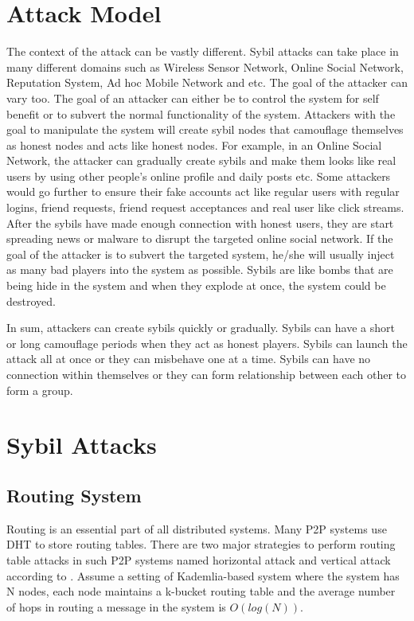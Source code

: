 \documentclass[conference]{IEEEtran}
\begin{document}
\section{Attack Model} \label{AttackModel}
The context of the attack can be vastly different. Sybil attacks can take place in many different domains such as Wireless Sensor Network, Online Social Network, 
Reputation System, Ad hoc Mobile Network and etc. The goal of the attacker can vary too. The goal of an attacker can either be to control the system for self benefit
or to subvert the normal functionality of the system. Attackers with the goal to manipulate the system will create sybil nodes that camouflage themselves as honest nodes and
acts like honest nodes. For example, in an Online Social Network, the attacker can gradually create sybils and make them looks like real users by using other people's
online profile and daily posts etc. Some attackers would go further to ensure their fake accounts act like regular users with regular logins, friend requests,
friend request acceptances and real user like click streams. After the sybils have made enough connection with honest users, they are start spreading news or malware 
to disrupt the targeted online social network. If the goal of the attacker is to subvert the targeted system, he/she will usually inject as many bad players into the system
as possible. Sybils are like bombs that are being hide in the system and when they explode at once, the system could be destroyed.

In sum, attackers can create sybils quickly or gradually. Sybils can have a short or long camouflage periods when they act as honest players.
Sybils can launch the attack all at once or they can misbehave one at a time. Sybils can have no connection within themselves or they can form relationship between each other
to form a group.

\section{Sybil Attacks} \label{SybilAttacks}
\subsection{Routing System}
Routing is an essential part of all distributed systems. Many P2P systems use DHT to store routing tables.
There are two major strategies to perform routing table attacks in such P2P systems named horizontal attack and vertical attack according to \cite{wang12dht}.
Assume a setting of Kademlia-based system\cite{maymounkov02kademlia} where the system has N nodes, each node maintains a k-bucket routing table and
the average number of hops in routing a message in the system is $O(log(N))$.
\end{document}
